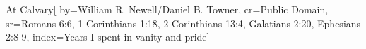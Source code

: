 {At Calvary}[
    by={William R. Newell/Daniel B. Towner},
    cr={Public Domain},
    sr={Romans 6:6, 1 Corinthians 1:18, 2 Corinthians 13:4, Galatians 2:20, Ephesians 2:8-9},
    index={Years I spent in vanity and pride}]
